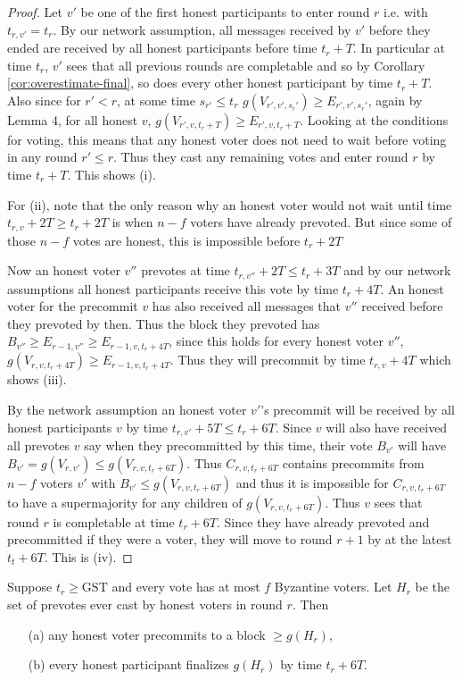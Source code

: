 \documentclass[a4paper,UKenglish,cleveref, autoref, thm-restate, anonymous]{lipics-v2019}
\def\GST{\mathrm{GST}}
\begin{document}
\begin{proof} Let $v'$ be one of the first honest participants to enter round $r$ i.e. with $t_{r,v'}=t_r$. 
By our network assumption, all messages received by $v'$ before they ended are received by all honest participants before time $t_r+T$.
In particular at time $t_r$, $v'$ sees that all previous rounds are completable and so by Corollary \ref{cor:overestimate-final}, so does every other honest participant by time $t_r+T$.
Also since for $r' < r$, at some time $s_{r'} \leq t_r$ $g(V_{r',v',s_r'}) \geq E_{r',v',s_r'}$, again by Lemma 4, for all honest $v$, $g(V_{r',v,t_r+T}) \geq E_{r',v,t_r+T}$. Looking at the conditions for voting, this means that any honest voter does not need to wait before voting in any round $r' \leq r$. 
Thus they cast any remaining votes and enter round $r$ by time $t_r + T$. This shows (i).

For (ii), note that the only reason why an honest voter would not wait until time $t_{r,v}+2T \geq t_r+ 2T$ is when $n-f$ voters have already prevoted. But since some of those $n-f$ votes are honest, this is impossible before $t_r+2T$

Now an honest voter $v''$ prevotes at time $t_{r,v''}+2T \leq t_r +3T$ and by our network assumptions all honest participants receive this vote by time $t_r+4T$. An honest voter for the precommit $v$ has also received all messages that $v''$ received before they prevoted by then.
Thus the block they prevoted has $B_{v''} \geq E_{r-1,v''} \geq E_{r-1,v,t_r+4T}$, since this holds for every honest voter $v''$, $g(V_{r,v,t_r+4T}) \geq E_{r-1,v,t_r+4T}$. Thus they will precommit by time $t_{r,v}+4T$ which shows (iii).

By the network assumption an honest voter $v'$'s precommit will be received by all honest participants $v$ by time $t_{r,v'}+ 5T \leq t_r+6T$.
Since $v$ will also have received all prevotes $v$ say when they precommitted by this time, their vote $B_{v'}$ will have $B_{v'}=g(V_{r,v'}) \leq g(V_{r,v,t_r+6T})$.
Thus $C_{r, v, t_r+6T}$ contains precommits from $n-f$ voters $v'$ with $B_{v'} \leq g(V_{r,v,t_r+6T})$ and thus it is impossible for $C_{r,v,t_r+6T}$ to have a supermajority for any children of $g(V_{r,v, t_r+6T})$.
Thus $v$ sees that round $r$ is completable at time $t_r+6T$. Since they have already prevoted and precommitted if they were a voter, they will move to round $r+1$ by at the latest $t_t+6T$. This is (iv).
\end{proof}

\begin{lemma} \label{lem:honest-prevote-timings}
Suppose $t_r \geq \GST$ and every vote has at most $f$ Byzantine voters. Let $H_r$ be the set of prevotes ever cast by honest voters in round $r$. Then
\begin{itemize}
\item[(a)] any honest voter precommits to a block $\geq  g(H_r)$,

\item[(b)] every honest participant finalizes $g(H_r)$ by time $t_r+6T$.
\end{itemize}
\end{lemma}
\end{document}
